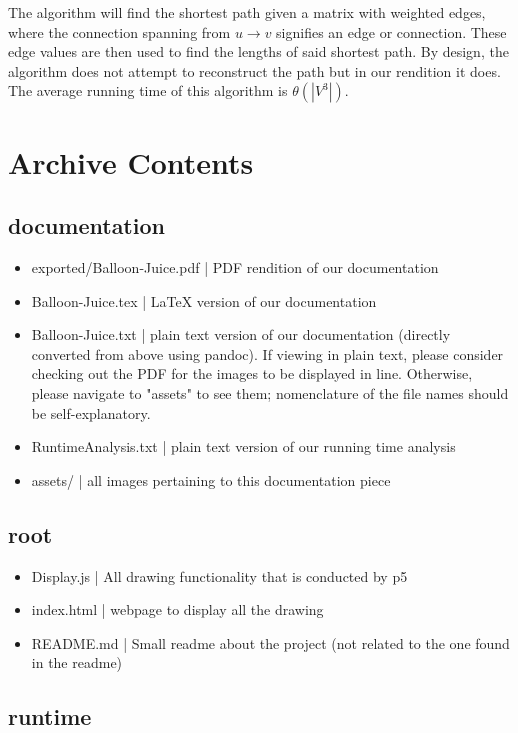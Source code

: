 \documentclass{article}
\begin{document}
The algorithm will find the shortest path given a matrix with weighted edges, where the connection spanning from $u \rightarrow v$ signifies an edge or connection.
These edge values are then used to find the lengths of said shortest path.
By design, the algorithm does not attempt to reconstruct the path but in our rendition it does.
The average running time of this algorithm is $\theta(|V^3|)$.

\newpage

\section{Archive Contents}

\subsection{documentation}
\begin{itemize}
\item exported/Balloon-Juice.pdf | PDF rendition of our documentation
\item Balloon-Juice.tex | LaTeX version of our documentation
\item Balloon-Juice.txt | plain text version of our documentation (directly converted from above using pandoc). If viewing in plain text, please consider checking out the PDF for the images to be displayed in line. Otherwise, please navigate to "assets" to see them; nomenclature of the file names should  be self-explanatory.
\item RuntimeAnalysis.txt | plain text version of our running time analysis
\item assets/\* | all images pertaining to this documentation piece
\end{itemize}

\subsection{root}

\begin{itemize}
\item Display.js | All drawing functionality that is conducted by p5
\item index.html | webpage to display all the drawing
\item README.md | Small readme about the project (not related to the one found in the readme)
\end{itemize}

\subsection{runtime}
\end{document}
